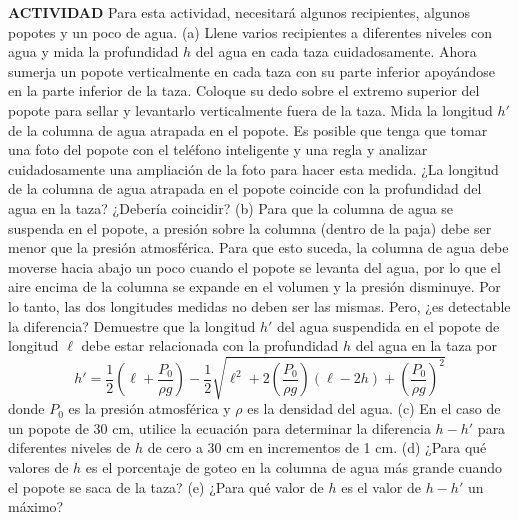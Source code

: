 \item \textbf{ACTIVIDAD} Para esta actividad, necesitará algunos recipientes, algunos popotes y un poco de agua. 
(a) Llene varios recipientes a diferentes niveles con agua y mida la profundidad $h$ del agua en cada taza cuidadosamente. Ahora sumerja un popote verticalmente en cada taza con su parte inferior apoyándose en la parte inferior de la taza. Coloque su dedo sobre el extremo superior del popote para sellar y levantarlo verticalmente fuera de la taza. Mida la longitud $h'$ de la columna de agua atrapada en el popote. Es posible que tenga que tomar una foto del popote con el teléfono inteligente y una regla y analizar cuidadosamente una ampliación de la foto para hacer esta medida. ¿La longitud de la columna de agua atrapada en el popote coincide con la profundidad del agua en la taza? ¿Debería coincidir? 
(b) Para que la columna de agua se suspenda en el popote, a presión sobre la columna (dentro de la paja) debe ser menor que la presión atmosférica. Para que esto suceda, la columna de agua debe moverse hacia abajo un poco cuando el popote se levanta del agua, por lo que el aire encima de la columna se expande en el volumen y la presión disminuye. Por lo tanto, las dos longitudes medidas no deben ser las mismas. Pero, ¿es detectable la diferencia? Demuestre que la longitud $h'$ del agua suspendida en el popote de longitud $\ell$ debe estar relacionada con la profundidad $h$ del agua en la taza por
$$h' = \frac{1}{2}\left(\ell + \frac{P_0}{\rho g}\right) - \frac{1}{2}\sqrt{\ell^2 + 2\left(\frac{P_0}{\rho g}\right)(\ell - 2h) + \left(\frac{P_0}{\rho g}\right)^2}$$
donde $P_0$ es la presión atmosférica y $\rho$ es la densidad del agua. 
(c) En el caso de un popote de 30 cm, utilice la ecuación para determinar la diferencia $h - h'$ para diferentes niveles de $h$ de cero a 30 cm en incrementos de 1 cm. 
(d) ¿Para qué valores de $h$ es el porcentaje de goteo en la columna de agua más grande cuando el popote se saca de la taza? 
(e) ¿Para qué valor de $h$ es el valor de $h - h'$ un máximo?

